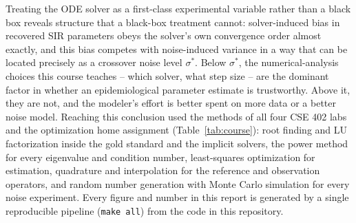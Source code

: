 Treating the ODE solver as a first-class experimental variable rather than a black box reveals
structure that a black-box treatment cannot: solver-induced bias in recovered SIR parameters obeys
the solver's own convergence order almost exactly, and this bias competes with noise-induced
variance in a way that can be located precisely as a crossover noise level $\sigma^*$. Below
$\sigma^*$, the numerical-analysis choices this course teaches -- which solver, what step size --
are the dominant factor in whether an epidemiological parameter estimate is trustworthy. Above it,
they are not, and the modeler's effort is better spent on more data or a better noise model.
Reaching this conclusion used the methods of all four CSE 402 labs and the optimization home
assignment (Table~\ref{tab:course}): root finding and LU factorization inside the gold standard
and the implicit solvers, the power method for every eigenvalue and condition number,
least-squares optimization for estimation, quadrature and
interpolation for the reference and observation operators, and random number generation with
Monte Carlo simulation for every noise experiment. Every
figure and number in this report is generated by a single reproducible pipeline
(\texttt{make all}) from the code in this repository.
